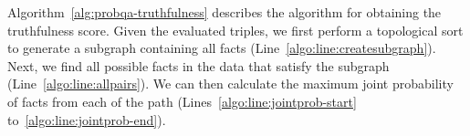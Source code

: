 Algorithm~\ref{alg:probqa-truthfulness} describes the algorithm for obtaining the truthfulness score.
Given the evaluated triples, we first perform a topological sort to generate a subgraph containing all facts (Line~\ref{algo:line:createsubgraph}).
Next, we find all possible facts in the data that satisfy the subgraph (Line~\ref{algo:line:allpairs}).
We can then calculate the maximum joint probability of facts from each of the path (Lines~\ref{algo:line:jointprob-start} to~\ref{algo:line:jointprob-end}).





